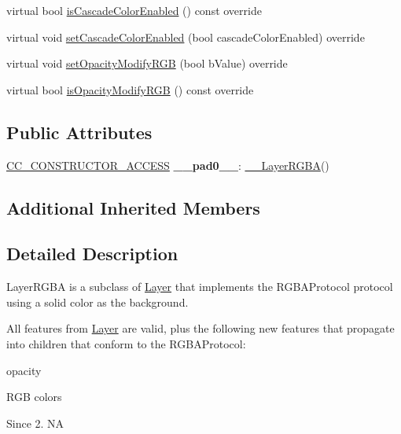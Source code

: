 \begin{DoxyCompactItemize}
\item 
virtual bool \hyperlink{class____LayerRGBA_abc02efad9eb89df47e6a0365dc9c784e}{is\+Cascade\+Color\+Enabled} () const override
\item 
virtual void \hyperlink{class____LayerRGBA_a6559d3d54c2a7a8a35873390043b0aa6}{set\+Cascade\+Color\+Enabled} (bool cascade\+Color\+Enabled) override
\item 
virtual void \hyperlink{class____LayerRGBA_a04037a60b1a1f9d5ba2760252ad2da35}{set\+Opacity\+Modify\+R\+GB} (bool b\+Value) override
\item 
virtual bool \hyperlink{class____LayerRGBA_a014dba2472f2708ad4493e97ca5999b0}{is\+Opacity\+Modify\+R\+GB} () const override
\end{DoxyCompactItemize}
\subsection*{Public Attributes}
\begin{DoxyCompactItemize}
\item 
\mbox{\label{class____LayerRGBA_ad3e60331e6f49ec9a830919963f8de45}} 
\hyperlink{_2cocos2d_2cocos_2base_2ccConfig_8h_a25ef1314f97c35a2ed3d029b0ead6da0}{C\+C\+\_\+\+C\+O\+N\+S\+T\+R\+U\+C\+T\+O\+R\+\_\+\+A\+C\+C\+E\+SS} {\bfseries \+\_\+\+\_\+pad0\+\_\+\+\_\+}\+: \hyperlink{class____LayerRGBA}{\+\_\+\+\_\+\+Layer\+R\+G\+BA}()
\end{DoxyCompactItemize}
\subsection*{Additional Inherited Members}


\subsection{Detailed Description}
Layer\+R\+G\+BA is a subclass of \hyperlink{classLayer}{Layer} that implements the R\+G\+B\+A\+Protocol protocol using a solid color as the background. 

All features from \hyperlink{classLayer}{Layer} are valid, plus the following new features that propagate into children that conform to the R\+G\+B\+A\+Protocol\+:
\begin{DoxyItemize}
\item opacity
\item R\+GB colors \begin{DoxySince}{Since}
2.  NA 
\end{DoxySince}

\end{DoxyItemize}

